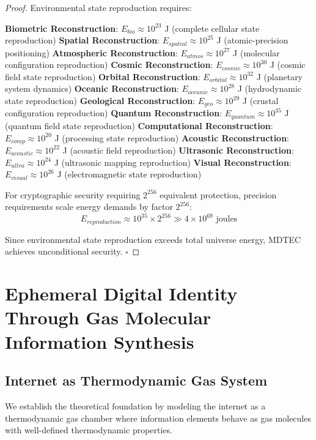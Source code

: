 \documentclass[12pt,a4paper]{article}
\begin{document}
\begin{proof}
Environmental state reproduction requires:

\textbf{Biometric Reconstruction}: $E_{bio} \approx 10^{23}$ J (complete cellular state reproduction)
\textbf{Spatial Reconstruction}: $E_{spatial} \approx 10^{25}$ J (atomic-precision positioning)
\textbf{Atmospheric Reconstruction}: $E_{atmos} \approx 10^{27}$ J (molecular configuration reproduction)
\textbf{Cosmic Reconstruction}: $E_{cosmic} \approx 10^{30}$ J (cosmic field state reproduction)
\textbf{Orbital Reconstruction}: $E_{orbital} \approx 10^{32}$ J (planetary system dynamics)
\textbf{Oceanic Reconstruction}: $E_{oceanic} \approx 10^{28}$ J (hydrodynamic state reproduction)
\textbf{Geological Reconstruction}: $E_{geo} \approx 10^{29}$ J (crustal configuration reproduction)
\textbf{Quantum Reconstruction}: $E_{quantum} \approx 10^{35}$ J (quantum field state reproduction)
\textbf{Computational Reconstruction}: $E_{comp} \approx 10^{20}$ J (processing state reproduction)
\textbf{Acoustic Reconstruction}: $E_{acoustic} \approx 10^{22}$ J (acoustic field reproduction)
\textbf{Ultrasonic Reconstruction}: $E_{ultra} \approx 10^{24}$ J (ultrasonic mapping reproduction)
\textbf{Visual Reconstruction}: $E_{visual} \approx 10^{26}$ J (electromagnetic state reproduction)

For cryptographic security requiring $2^{256}$ equivalent protection, precision requirements scale energy demands by factor $2^{256}$:
\begin{equation}
E_{reproduction} \approx 10^{35} \times 2^{256} \gg 4 \times 10^{69} \text{ joules}
\end{equation}

Since environmental state reproduction exceeds total universe energy, MDTEC achieves unconditional security. $\square$
\end{proof}

\section{Ephemeral Digital Identity Through Gas Molecular Information Synthesis}

\subsection{Internet as Thermodynamic Gas System}

We establish the theoretical foundation by modeling the internet as a thermodynamic gas chamber where information elements behave as gas molecules with well-defined thermodynamic properties.
\end{document}

